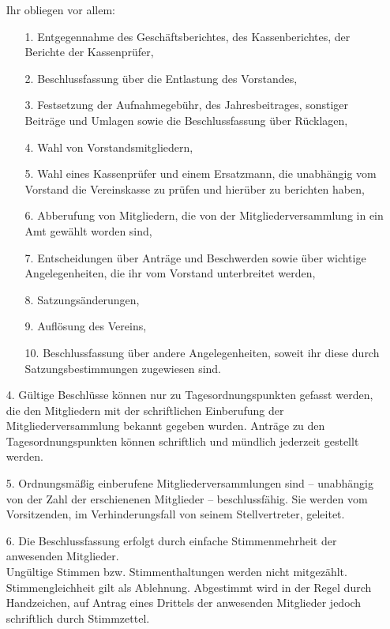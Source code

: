 \documentclass{scrartcl}
\begin{document}
\begin{itemize}
	Ihr obliegen vor allem:
		\begin{itemize}
			\item[1.]  Entgegennahme des Geschäftsberichtes, des Kassenberichtes, der
					   Berichte der Kassenprüfer,
			\item[2.]  Beschlussfassung über die Entlastung des Vorstandes,
			\item[3.]  Festsetzung der Aufnahmegebühr, des Jahresbeitrages, sonstiger
					   Beiträge und Umlagen sowie die Beschlussfassung über Rücklagen,
			\item[4.]  Wahl von Vorstandsmitgliedern,
			\item[5.]  Wahl eines Kassenprüfer und einem Ersatzmann, die unabhängig vom
				       Vorstand die Vereinskasse zu prüfen und hierüber zu berichten
				       haben,
			\item[6.]  Abberufung von Mitgliedern, die von der Mitgliederversammlung in
					   ein Amt gewählt worden sind,
			\item[7.]  Entscheidungen über Anträge und Beschwerden sowie über wichtige
					   Angelegenheiten, die ihr vom Vorstand unterbreitet werden,
			\item[8.]  Satzungsänderungen,
			\item[9.]  Auflösung des Vereins,
			\item[10.] Beschlussfassung über andere Angelegenheiten, soweit ihr diese
					   durch Satzungsbestimmungen zugewiesen sind.
		\end{itemize}
	\item[4.] Gültige Beschlüsse können nur zu Tagesordnungspunkten gefasst werden, die
			  den Mitgliedern mit der schriftlichen Einberufung der
			  Mitgliederversammlung bekannt gegeben wurden. Anträge zu den
			  Tagesordnungspunkten können schriftlich und mündlich jederzeit gestellt
			  werden.
	\item[5.] Ordnungsmäßig einberufene Mitgliederversammlungen sind – unabhängig von
			  der Zahl der erschienenen Mitglieder – beschlussfähig. Sie werden vom
			  Vorsitzenden, im Verhinderungsfall von seinem Stellvertreter, geleitet.
	\item[6.] Die Beschlussfassung erfolgt durch einfache Stimmenmehrheit der anwesenden
			  Mitglieder.\\
              Ungültige Stimmen bzw. Stimmenthaltungen werden nicht mitgezählt.
              Stimmengleichheit gilt als Ablehnung. Abgestimmt wird in der Regel durch
              Handzeichen, auf Antrag eines Drittels der anwesenden Mitglieder jedoch
              schriftlich durch Stimmzettel.\\

\end{itemize}
\end{document}
